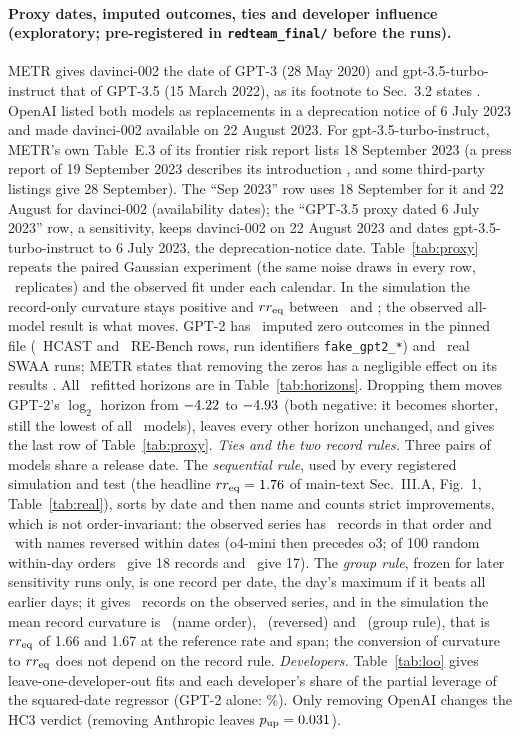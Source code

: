 \documentclass[aps,pre,twocolumn,superscriptaddress,nofootinbib,9pt]{revtex4-2}
\newcommand{\rreq}{rr_{\rm eq}}
\begin{document}
\paragraph*{Proxy dates, imputed outcomes, ties and developer influence (exploratory; pre-registered in \texttt{redteam\_final/} before the runs).} METR gives davinci-002 the date of GPT-3 (28 May 2020) and gpt-3.5-turbo-instruct that of GPT-3.5 (15 March 2022), as its footnote to Sec.~3.2 states \cite{kwa2025}. OpenAI listed both models as replacements in a deprecation notice of 6 July 2023 and made davinci-002 available on 22 August 2023. For gpt-3.5-turbo-instruct, METR's own Table~E.3 of its frontier risk report lists 18 September 2023 \cite{metr2026risk} (a press report of 19 September 2023 describes its introduction \cite{decoder2023}, and some third-party listings give 28 September). The ``Sep 2023'' row uses 18 September for it and 22 August for davinci-002 (availability dates); the ``GPT-3.5 proxy dated 6 July 2023'' row, a sensitivity, keeps davinci-002 on 22 August 2023 and dates gpt-3.5-turbo-instruct to 6 July 2023, the deprecation-notice date. Table~\ref{tab:proxy} repeats the paired Gaussian experiment (the same noise draws in every row, \proxReps\ replicates) and the observed fit under each calendar. In the simulation the record-only curvature stays positive and $\rreq$ between \proxSimMin\ and \proxSimMax; the observed all-model result is what moves. GPT-2 has \impN\ imputed zero outcomes in the pinned file (\impHcast\ HCAST and \impRe\ RE-Bench rows, run identifiers \texttt{fake\_gpt2\_*}) and \impSwaa\ real SWAA runs; METR states that removing the zeros has a negligible effect on its results \cite{kwa2025}. All \nModels\ refitted horizons are in Table~\ref{tab:horizons}. Dropping them moves GPT-2's $\log_2$ horizon from $-4.22$ to $-4.93$ (both negative: it becomes shorter, still the lowest of all \nModels\ models), leaves every other horizon unchanged, and gives the last row of Table~\ref{tab:proxy}. \emph{Ties and the two record rules.} Three pairs of models share a release date. The \emph{sequential rule}, used by every registered simulation and test (the headline $\rreq=\biasRrSota$ of main-text Sec.~III.A, Fig.~1, Table~\ref{tab:real}), sorts by date and then name and counts strict improvements, which is not order-invariant: the observed series has \tieNameN\ records in that order and \tieRevN\ with names reversed within dates (o4-mini then precedes o3; of 100 random within-day orders \tieRandEighteen\ give 18 records and \tieRandSeventeen\ give 17). The \emph{group rule}, frozen for later sensitivity runs only, is one record per date, the day's maximum if it beats all earlier days; it gives \tieGroupN\ records on the observed series, and in the simulation the mean record curvature is \tieSimName\ (name order), \tieSimRev\ (reversed) and \tieSimGroup\ (group rule), that is $\rreq$ of 1.66 and 1.67 at the reference rate and span; the conversion of curvature to $\rreq$ does not depend on the record rule. \emph{Developers.} Table~\ref{tab:loo} gives leave-one-developer-out fits and each developer's share of the partial leverage of the squared-date regressor (GPT-2 alone: \levGptTwo\%). Only removing OpenAI changes the HC3 verdict (removing Anthropic leaves $p_{\rm up}=0.031$).
\end{document}
